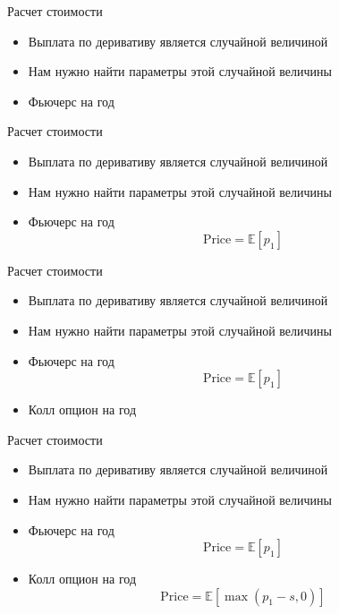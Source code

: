 \documentclass{beamer}
\newcommand{\E}{\ensuremath{\mathbb{E}}}
\begin{document}
    \begin{frame}{Расчет стоимости}
        \begin{itemize}
            \item Выплата по деривативу является случайной величиной
            \item Нам нужно найти параметры этой случайной величины
        \end{itemize}
        \begin{itemize}
            \item Фьючерс на год
        \end{itemize}
    \end{frame}

    \begin{frame}{Расчет стоимости}
        \begin{itemize}
            \item Выплата по деривативу является случайной величиной
            \item Нам нужно найти параметры этой случайной величины
        \end{itemize}
        \begin{itemize}
            \item Фьючерс на год
            \[
                \mathrm{Price} = \E \left[ p_1 \right]
            \]
        \end{itemize}
    \end{frame}

    \begin{frame}{Расчет стоимости}
        \begin{itemize}
            \item Выплата по деривативу является случайной величиной
            \item Нам нужно найти параметры этой случайной величины
        \end{itemize}
        \begin{itemize}
            \item Фьючерс на год
            \[
                \mathrm{Price} = \E \left[ p_1 \right]
            \]
            \item Колл опцион на год
        \end{itemize}
    \end{frame}

    \begin{frame}{Расчет стоимости}
        \begin{itemize}
            \item Выплата по деривативу является случайной величиной
            \item Нам нужно найти параметры этой случайной величины
        \end{itemize}
        \begin{itemize}
            \item Фьючерс на год
            \[
                \mathrm{Price} = \E \left[ p_1 \right]
            \]
            \item Колл опцион на год
            \[
                \mathrm{Price} = \E \left[ \max{(p_1 - s, 0)} \right]
            \]
        \end{itemize}
    \end{frame}
\end{document}
